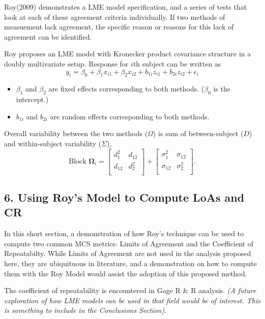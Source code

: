 \documentclass[Main.tex]{subfiles}
\begin{document}
Roy(2009) demonstrates a LME model specification, and a series of tests that look at each of these agreement criteria individually. If two methods of measuement lack agreement, the specific reason or reasons for this lack of agreement can be identified.


Roy proposes an LME model with Kronecker product covariance structure in a doubly multivariate setup. Response for $i$th subject can be written as
\[ y_i = \beta_0 + \beta_1x_{i1} + \beta_2x_{i2} + b_{1i}z_{i1}  + b_{2i}z_{i2} + \epsilon_i \]
\begin{itemize}
	\item $\beta_1$ and $\beta_2$ are fixed effects corresponding to both methods. ($\beta_0$ is the intercept.)
	\item $b_{1i}$ and $b_{2i}$ are random effects corresponding to both methods.
\end{itemize}

Overall variability between the two methods ($\Omega$) is sum of between-subject ($D$) and within-subject variability ($\Sigma$),
\[
\mbox{Block } \boldsymbol{\Omega}_i = \left[ \begin{array}{cc} d^2_1 & d_{12}\\ d_{12} & d^2_2\\ \end{array} \right]
+ \left[\begin{array}{cc} \sigma^2_1 & \sigma_{12}\\ \sigma_{12} & \sigma^2_2\\ \end{array}\right].
\]
\subsection*{6. Using Roy's Model to Compute LoAs and CR }

In this short section, a demonstration of how Roy's technique can be used to compute two common MCS metrics: Limits of Agreement and the Coefficient of Repeatabilty. While Limits of Agreement are not used in the analysis proposed here, they are ubiquituous in literature, and a demonstration on how to compute them with the Roy Model would assist the adoption of this proposed method.

The coefficient of repeatability is encountered in Gage R \& R analysis. \textit{(A future exploration of how LME models can be used in that field would be of interest. This is something to include in the Conclusions Section).}
\end{document}
